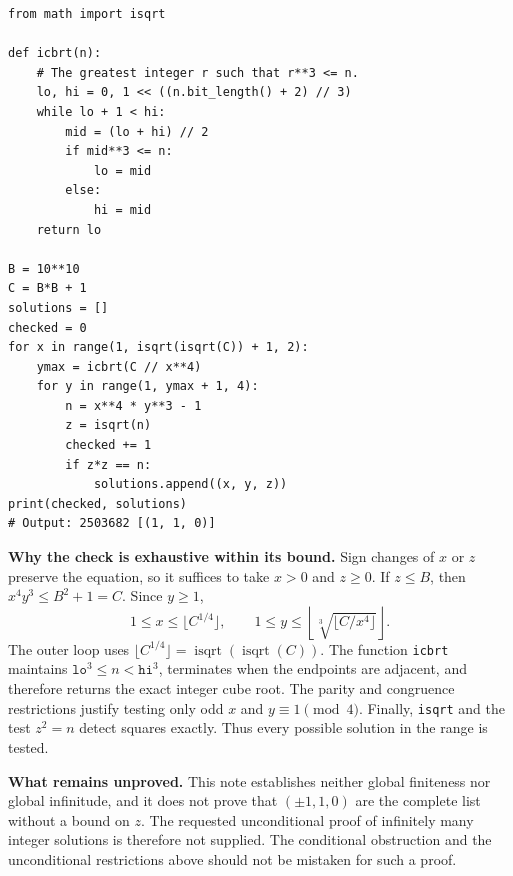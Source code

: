 \documentclass[11pt,a4paper]{article}
\begin{document}
\begin{lstlisting}
from math import isqrt

def icbrt(n):
    # The greatest integer r such that r**3 <= n.
    lo, hi = 0, 1 << ((n.bit_length() + 2) // 3)
    while lo + 1 < hi:
        mid = (lo + hi) // 2
        if mid**3 <= n:
            lo = mid
        else:
            hi = mid
    return lo

B = 10**10
C = B*B + 1
solutions = []
checked = 0
for x in range(1, isqrt(isqrt(C)) + 1, 2):
    ymax = icbrt(C // x**4)
    for y in range(1, ymax + 1, 4):
        n = x**4 * y**3 - 1
        z = isqrt(n)
        checked += 1
        if z*z == n:
            solutions.append((x, y, z))
print(checked, solutions)
# Output: 2503682 [(1, 1, 0)]
\end{lstlisting}

\textbf{Why the check is exhaustive within its bound.}
Sign changes of $x$ or $z$ preserve the equation, so it suffices to take $x>0$
and $z\ge0$. If $z\le B$, then $x^4y^3\le B^2+1=C$. Since $y\ge1$,
\[
 1\le x\le\lfloor C^{1/4}\rfloor,
 \qquad
 1\le y\le\left\lfloor\sqrt[3]{\lfloor C/x^4\rfloor}\right\rfloor.
\]
The outer loop uses $\lfloor C^{1/4}\rfloor=\operatorname{isqrt}
(\operatorname{isqrt}(C))$. The function \texttt{icbrt} maintains
$\texttt{lo}^3\le n<\texttt{hi}^3$, terminates when the endpoints are adjacent,
and therefore returns the exact integer cube root. The parity and congruence
restrictions justify testing only odd $x$ and $y\equiv1\pmod4$. Finally,
\texttt{isqrt} and the test $z^2=n$ detect squares exactly. Thus every possible
solution in the range is tested.

\textbf{What remains unproved.}
This note establishes neither global finiteness nor global infinitude, and it
does not prove that $(\pm1,1,0)$ are the complete list without a bound on $z$.
The requested unconditional proof of infinitely many integer solutions is
therefore not supplied. The conditional obstruction and the unconditional
restrictions above should not be mistaken for such a proof.
\end{document}
